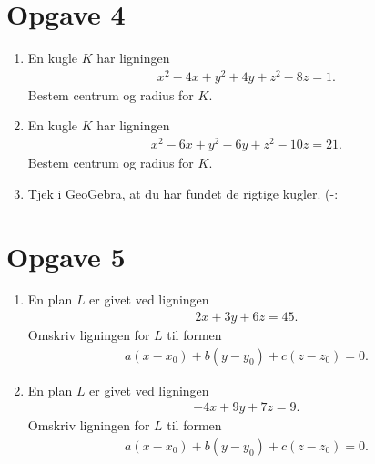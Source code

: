 \section*{Opgave 4}
\begin{enumerate}[label=\roman*)]
	\item En kugle $K$ har ligningen 
	\begin{align*}
		x^2 -4x+y^2+4y+z^2-8z=1.
	\end{align*}
	Bestem centrum og radius for $K$.
	\item En kugle $K$ har ligningen 
	\begin{align*}
		x^2-6x+y^2-6y+z^2-10z=21.
	\end{align*}
	Bestem centrum og radius for $K$.
	\item Tjek i GeoGebra, at du har fundet de rigtige kugler. (-: 
\end{enumerate}
\section*{Opgave 5}
\begin{enumerate}[label=\roman*)]
	\item En plan $L$ er givet ved ligningen 
	\begin{align*}
		2x+3y+6z = 45.
	\end{align*}
	Omskriv ligningen for $L$ til formen 
	\begin{align*}
		a(x-x_0)+b(y-y_0)+c(z-z_0) = 0.
	\end{align*}
	\item En plan $L$ er givet ved ligningen 
	\begin{align*}
		-4x+9y+7z = 9.
	\end{align*}
	Omskriv ligningen for $L$ til formen 
	\begin{align*}
		a(x-x_0)+b(y-y_0)+c(z-z_0) = 0.
	\end{align*}
\end{enumerate}
